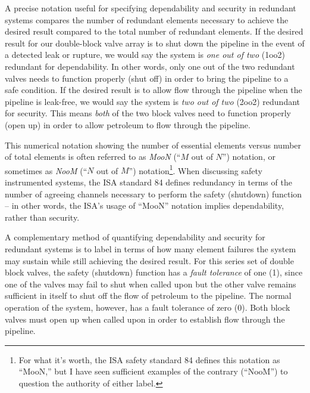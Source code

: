 \vskip 10pt

\filbreak

A precise notation useful for specifying dependability and security in redundant systems compares the number of redundant elements necessary to achieve the desired result compared to the total number of redundant elements.  If the desired result for our double-block valve array is to shut down the pipeline in the event of a detected leak or rupture, we would say the system is \textit{one out of two} (1oo2) redundant for dependability.  In other words, only one out of the two redundant valves needs to function properly (shut off) in order to bring the pipeline to a safe condition.  If the desired result is to allow flow through the pipeline when the pipeline is leak-free, we would say the system is \textit{two out of two} (2oo2) redundant for security.  This means \textit{both} of the two block valves need to function properly (open up) in order to allow petroleum to flow through the pipeline.

This numerical notation showing the number of essential elements versus number of total elements is often referred to as \textit{MooN} (``$M$ out of $N$'') notation, or sometimes as \textit{NooM} (``$N$ out of $M$'') notation\footnote{For what it's worth, the ISA safety standard 84 defines this notation as ``MooN,'' but I have seen sufficient examples of the contrary (``NooM'') to question the authority of either label.}.  When discussing safety instrumented systems, the ISA standard 84 defines redundancy in terms of the number of agreeing channels necessary to perform the safety (shutdown) function -- in other words, the ISA's usage of ``MooN'' notation implies dependability, rather than security.    

\vskip 10pt

A complementary method of quantifying dependability and security for redundant systems is to label in terms of how many element failures the system may sustain while still achieving the desired result.  For this series set of double block valves, the safety (shutdown) function has a \textit{fault tolerance} of one (1), since one of the valves may fail to shut when called upon but the other valve remains sufficient in itself to shut off the flow of petroleum to the pipeline.  The normal operation of the system, however, has a fault tolerance of zero (0).  Both block valves must open up when called upon in order to establish flow through the pipeline.  


